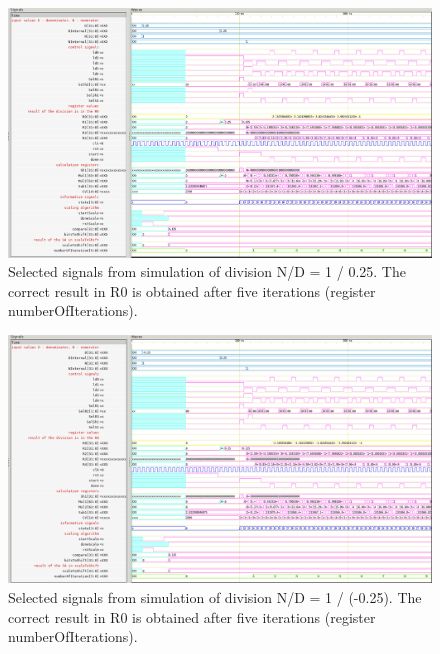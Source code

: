 \documentclass[a4paper, twoside, 11pt]{article}
\begin{document}
\begin{figure}[htbp!]
  \centering
  \includegraphics[width=1\textwidth]{src/png/inverted/division-1-div-0-25.png}
   \caption{Selected signals from simulation of division N/D = 1 / 0.25. The correct result in R0 is obtained after five iterations (register numberOfIterations).}
  \label{fig:division-1-div-0-25}
\end{figure}

\begin{figure}[htbp!]
  \centering
  \includegraphics[width=1\textwidth]{src/png/inverted/division-1-div-minus-0-25.png}
    \caption{Selected signals from simulation of division N/D = 1 / (-0.25). The correct result in R0 is obtained after five iterations (register numberOfIterations).}
  \label{fig:division-1-div-minus-0-25}
\end{figure}
\end{document}
